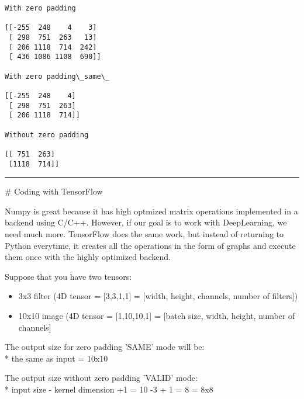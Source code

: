 \documentclass[11pt]{article}
\providecommand{\tightlist}{%
      \setlength{\itemsep}{0pt}\setlength{\parskip}{0pt}}
\begin{document}
    \begin{Verbatim}[commandchars=\\\{\}]
With zero padding 

[[-255  248    4    3]
 [ 298  751  263   13]
 [ 206 1118  714  242]
 [ 436 1086 1108  690]] 

With zero padding\_same\_ 

[[-255  248    4]
 [ 298  751  263]
 [ 206 1118  714]] 

Without zero padding 

[[ 751  263]
 [1118  714]]

    \end{Verbatim}

    \begin{center}\rule{0.5\linewidth}{\linethickness}\end{center}

     \# Coding with TensorFlow

    Numpy is great because it has high optmized matrix operations
implemented in a backend using C/C++. However, if our goal is to work
with DeepLearning, we need much more. TensorFlow does the same work, but
instead of returning to Python everytime, it creates all the operations
in the form of graphs and execute them once with the highly optimized
backend.

Suppose that you have two tensors:

\begin{itemize}
\tightlist
\item
  3x3 filter (4D tensor = {[}3,3,1,1{]} = {[}width, height, channels,
  number of filters{]})
\item
  10x10 image (4D tensor = {[}1,10,10,1{]} = {[}batch size, width,
  height, number of channels{]}
\end{itemize}

The output size for zero padding 'SAME' mode will be:\\
* the same as input = 10x10

The output size without zero padding 'VALID' mode:\\
* input size - kernel dimension +1 = 10 -3 + 1 = 8 = 8x8
\end{document}
